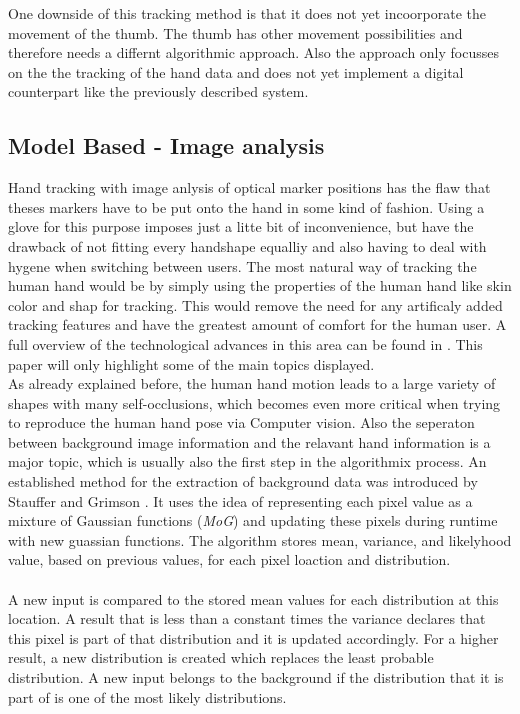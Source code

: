 One downside of this tracking method is that it does not yet incoorporate the movement of the thumb. The thumb has other movement possibilities and therefore needs a differnt algorithmic approach. Also the approach only focusses on the the tracking of the hand data and does not yet implement a digital counterpart like the previously described system.
\subsection{Model Based - Image analysis}
Hand tracking with image anlysis of optical marker positions has the flaw that theses markers have to be put onto the hand in some kind of fashion. Using a glove for this purpose imposes just a litte bit of inconvenience, but have the drawback of not fitting every handshape equalliy and also having to deal with hygene when switching between users. The most natural way of tracking the human hand would be by simply using the properties of the human hand like skin color and shap for tracking. This would remove the need for any artificaly added tracking features and have the greatest amount of comfort for the human user.
A full overview of the technological advances in this area can be found in \cite{Moeslund.2006,Moeslund.2001}. This paper will only highlight some of the main topics displayed.\\
As already explained before, the human hand motion leads to a large variety of shapes with many self-occlusions, which becomes even more critical when trying to reproduce the human hand pose via Computer vision. Also the seperaton between background image information and the relavant hand information is a major topic, which is usually also the first step in the algorithmix process.
An established method for the extraction of background data was introduced by Stauffer and Grimson \cite{Stauffer.1999}. It uses the idea of representing each pixel value as a mixture of Gaussian functions (\textit{MoG}) and updating these pixels during runtime with new guassian functions.
The algorithm stores mean, variance, and likelyhood value, based on previous values, for each pixel loaction and distribution.\\\\ 
A new input is compared to the stored mean values for each distribution at this location.
A result that is less than a constant times the variance declares that this pixel is part of that distribution and it is updated accordingly. For a higher result, a new distribution is created which replaces the least probable distribution. A new input belongs to the background if the distribution that it is part of is one of the most likely distributions.
